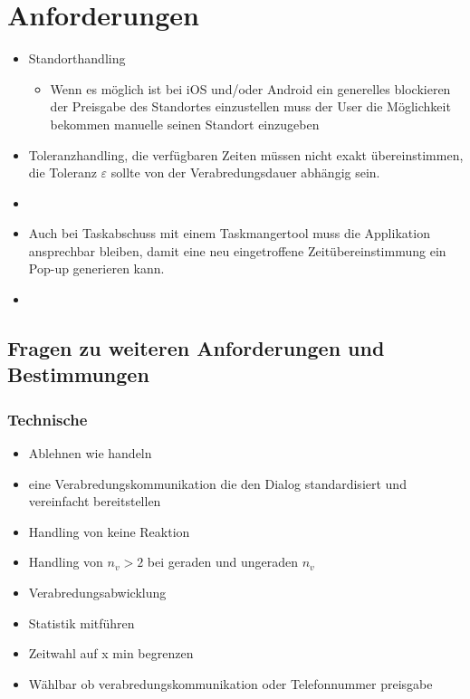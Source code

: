 \section{Anforderungen}

\begin{itemize}
\item Standorthandling
\begin{itemize}
\item Wenn es möglich ist bei iOS und/oder Android ein generelles blockieren der Preisgabe des Standortes einzustellen muss der User die Möglichkeit bekommen manuelle seinen Standort einzugeben
\end{itemize}
\item Toleranzhandling, die verfügbaren Zeiten müssen nicht exakt übereinstimmen, die Toleranz $\varepsilon$ sollte von der Verabredungsdauer abhängig sein.
\item {}
\item Auch bei Taskabschuss mit einem Taskmangertool muss die Applikation ansprechbar bleiben, damit eine neu eingetroffene Zeitübereinstimmung ein Pop-up generieren kann.
\item {} 
\end{itemize}




\subsection{Fragen zu weiteren Anforderungen und Bestimmungen}

\subsubsection{Technische}


\begin{itemize}
\item Ablehnen wie handeln
\item eine Verabredungskommunikation die den Dialog standardisiert und vereinfacht bereitstellen
\item Handling von keine Reaktion
\item Handling von $n_v>2$ bei geraden und ungeraden $n_v$
\item Verabredungsabwicklung
\item Statistik mitführen
\item Zeitwahl auf x min begrenzen
\item Wählbar ob verabredungskommunikation oder Telefonnummer preisgabe
\end{itemize}


